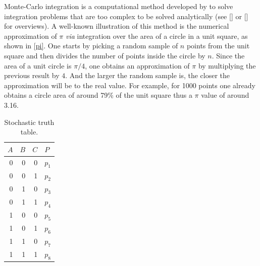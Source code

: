 \documentclass[a4paper,11pt]{article}
\begin{document}
Monte-Carlo integration is a computational method developed by \cite{Metropolis1949} to solve integration problems that are too complex to be solved analytically (see \citeauthor{Hammersley1964} [\citeyear{Hammersley1964}] or \citeauthor{Krauth2006} [\citeyear{Krauth2006}] for overviews). A well-known illustration of this method is the numerical approximation of $\pi$ \emph{via} integration over the area of a circle in a unit square, as shown in \autoref{pi}. One starts by picking a random sample of $n$ points from the unit square and then divides the number of points inside the circle by $n$. Since the area of a unit circle is $\pi/4$, one obtains an approximation of $\pi$ by multiplying the previous result by $4$. And the larger the random sample is, the closer the approximation will be to the real value. For example, for 1000 points one already obtains a circle area of around 79\% of the unit square thus a $\pi$ value of around 3.16.

\begin{table}[t]
\caption{Stochastic truth table.}
\centering
\begin{tabular}{rrrl} 
\hline
$A$ & $B$ & $C$ & $P$\\
\hline
0&0&0 & $p_1$ \\
0&0&1 & $p_2$\\
0&1&0 & $p_3$\\
0&1&1 & $p_4$\\
1&0&0 & $p_5$\\
1&0&1 & $p_6$\\
1&1&0 & $p_7$\\
1&1&1 & $p_8$\\
\hline
\end{tabular}
\label{stochastic}
\end{table} 
\end{document}
